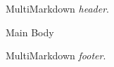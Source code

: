 
\def\mytitle{MMD Header and Footer}


MultiMarkdown \emph{header}.

Main Body

MultiMarkdown \emph{footer}.



